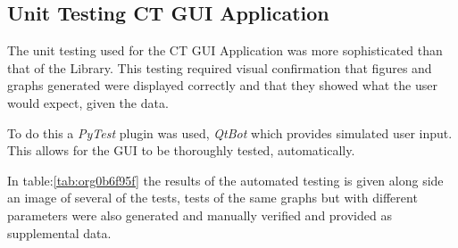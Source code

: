 \documentclass[11pt]{report}
\begin{document}
\clearpage

\subsection{Unit Testing CT GUI Application}
\label{sec:orgb454133}
The unit testing used for the CT GUI Application was more sophisticated than that of the Library. This testing required visual confirmation that figures and graphs generated were displayed correctly and that they showed what the user would expect, given the data.

To do this a \emph{PyTest} plugin was used, \emph{QtBot} which provides simulated user input. This allows for the GUI to be thoroughly tested, automatically.

In table:\ref{tab:org0b6f95f} the results of the automated testing is given along side an image of several of the tests, tests of the same graphs but with different parameters were also generated and manually verified and provided as supplemental data.
\end{document}
